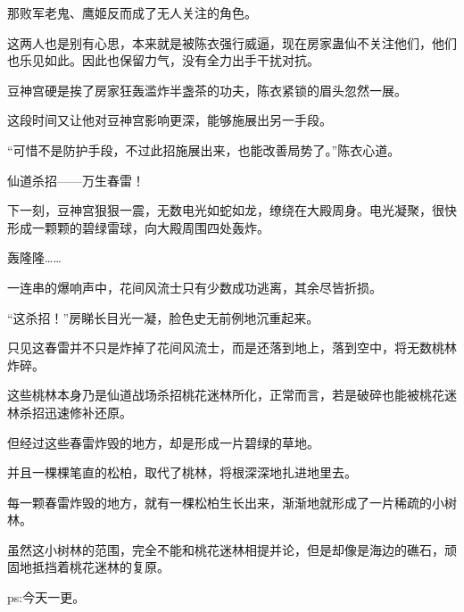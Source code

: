 \begin{this_body}
那败军老鬼、鹰姬反而成了无人关注的角色。

这两人也是别有心思，本来就是被陈衣强行威逼，现在房家蛊仙不关注他们，他们也乐见如此。因此也保留力气，没有全力出手干扰对抗。

豆神宫硬是挨了房家狂轰滥炸半盏茶的功夫，陈衣紧锁的眉头忽然一展。

这段时间又让他对豆神宫影响更深，能够施展出另一手段。

“可惜不是防护手段，不过此招施展出来，也能改善局势了。”陈衣心道。

仙道杀招——万生春雷！

下一刻，豆神宫狠狠一震，无数电光如蛇如龙，缭绕在大殿周身。电光凝聚，很快形成一颗颗的碧绿雷球，向大殿周围四处轰炸。

轰隆隆……

一连串的爆响声中，花间风流士只有少数成功逃离，其余尽皆折损。

“这杀招！”房睇长目光一凝，脸色史无前例地沉重起来。

只见这春雷并不只是炸掉了花间风流士，而是还落到地上，落到空中，将无数桃林炸碎。

这些桃林本身乃是仙道战场杀招桃花迷林所化，正常而言，若是破碎也能被桃花迷林杀招迅速修补还原。

但经过这些春雷炸毁的地方，却是形成一片碧绿的草地。

并且一棵棵笔直的松柏，取代了桃林，将根深深地扎进地里去。

每一颗春雷炸毁的地方，就有一棵松柏生长出来，渐渐地就形成了一片稀疏的小树林。

虽然这小树林的范围，完全不能和桃花迷林相提并论，但是却像是海边的礁石，顽固地抵挡着桃花迷林的复原。

ps:今天一更。

\end{this_body}

